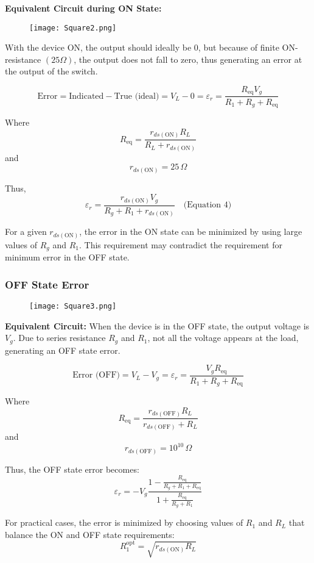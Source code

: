 \documentclass[a4paper,9pt,twoside,openany,twocolumn]{memoir}
\begin{document}
\textbf{Equivalent Circuit during ON State:}  
\begin{figure}[h]
    \centering
    \texttt{[image: Square2.png]}
    \caption{}
\end{figure}
With the device ON, the output should ideally be 0, but because of finite ON-resistance \( (25 \Omega) \), the output does not fall to zero, thus generating an error at the output of the switch.

\[
\text{Error} = \text{Indicated} - \text{True (ideal)} = V_L - 0 = \varepsilon_r = \frac{R_{\text{eq}} V_g}{R_1 + R_g + R_{\text{eq}}}
\]

Where
\[
R_{\text{eq}} = \frac{r_{ds(\text{ON})} R_L}{R_L + r_{ds(\text{ON})}}
\]
and
\[
r_{ds(\text{ON})} = 25 \, \Omega
\]

Thus,
\[
\varepsilon_r = \frac{r_{ds(\text{ON})} V_g}{R_g + R_1 + r_{ds(\text{ON})}} \quad \text{(Equation 4)}
\]

For a given \( r_{ds(\text{ON})} \), the error in the ON state can be minimized by using large values of \( R_g \) and \( R_1 \). This requirement may contradict the requirement for minimum error in the OFF state.

\subsubsection*{OFF State Error}
\begin{figure}[h]
    \centering
    \texttt{[image: Square3.png]}
    \caption{}
\end{figure}
\textbf{Equivalent Circuit:}  
When the device is in the OFF state, the output voltage is \( V_g \). Due to series resistance \( R_g \) and \( R_1 \), not all the voltage appears at the load, generating an OFF state error.

\[
\text{Error (OFF)} = V_L - V_g = \varepsilon_r = \frac{V_g R_{\text{eq}}}{R_1 + R_g + R_{\text{eq}}}
\]

Where
\[
R_{\text{eq}} = \frac{r_{ds(\text{OFF})} R_L}{r_{ds(\text{OFF})} + R_L}
\]
and
\[
r_{ds(\text{OFF})} = 10^{10} \, \Omega
\]

Thus, the OFF state error becomes:
\[
\varepsilon_r = -V_g \frac{1 - \frac{R_{\text{eq}}}{R_g + R_1 + R_{\text{eq}}}}{1 + \frac{R_{\text{eq}}}{R_g + R_1}}
\]

For practical cases, the error is minimized by choosing values of \( R_1 \) and \( R_L \) that balance the ON and OFF state requirements:
\[
R_1^{\text{opt}} = \sqrt{r_{ds(\text{ON})} R_L}
\]
\end{document}
